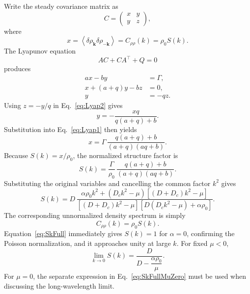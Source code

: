 \documentclass{article}
\begin{document}
Write the steady covariance matrix as
\begin{equation}
    C=\begin{pmatrix}x&y\\y&z\end{pmatrix},
\end{equation}
where
\begin{equation}
    x=\left\langle\delta\rho_{\mathbf k}\delta\rho_{-\mathbf k}\right\rangle
    =C_{\rho\rho}(k)=\rho_0S(k).
    \label{eq:xIsDensityCovariance}
\end{equation}
The Lyapunov equation
\begin{equation}
    AC+CA^{\top}+Q=0
    \label{eq:Lyapunov}
\end{equation}
produces
\begin{subequations}
    \begin{align}
        ax-by&=\Gamma,\label{eq:Lyap1}\\
        x+(a+q)y-bz&=0,\label{eq:Lyap2}\\
        y&=-qz.\label{eq:Lyap3}
    \end{align}
\end{subequations}
Using $z=-y/q$ in Eq.~\eqref{eq:Lyap2} gives
\begin{equation}
    y=-\frac{xq}{q(a+q)+b}.
\end{equation}
Substitution into Eq.~\eqref{eq:Lyap1} then yields
\begin{equation}
    x=\Gamma\,
    \frac{q(a+q)+b}{(a+q)(aq+b)}.
    \label{eq:DensityCovarianceLyapunov}
\end{equation}
Because $S(k)=x/\rho_0$, the normalized structure factor is
\begin{equation}
    S(k)=\frac{\Gamma}{\rho_0}\,
    \frac{q(a+q)+b}{(a+q)(aq+b)}.
\end{equation}
Substituting the original variables and cancelling the common factor $k^2$ gives
\begin{equation}
    \boxed{
    S(k)=D\,
    \frac{\alpha\rho_0k^2+(D_ck^2-\mu)\left[(D+D_c)k^2-\mu\right]}
    {\left[(D+D_c)k^2-\mu\right]\left[D(D_ck^2-\mu)+\alpha\rho_0\right]}
    }.
    \label{eq:SkFull}
\end{equation}
The corresponding unnormalized density spectrum is simply
\begin{equation}
    C_{\rho\rho}(k)=\rho_0S(k).
\end{equation}
Equation~\eqref{eq:SkFull} immediately gives $S(k)=1$ for $\alpha=0$, confirming the Poisson normalization, and it approaches unity at large $k$. For fixed $\mu<0$,
\begin{equation}
    \lim_{k\to0}S(k)
    =\frac{D}{D-\dfrac{\alpha\rho_0}{\mu}}.
\end{equation}
For $\mu=0$, the separate expression in Eq.~\eqref{eq:SkFullMuZero} must be used when discussing the long-wavelength limit.
\end{document}
